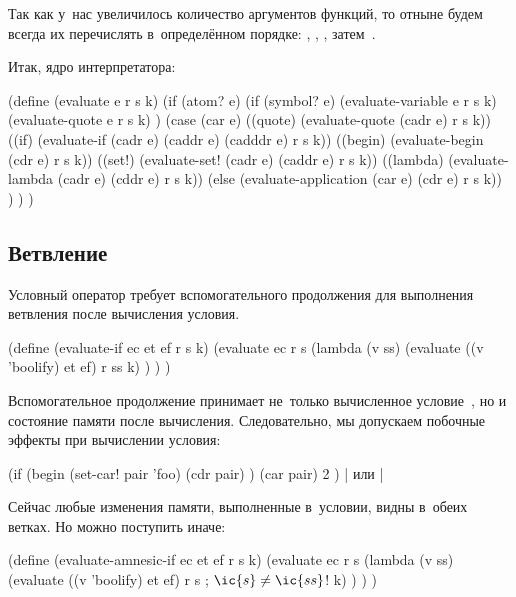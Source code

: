 Так как у~нас увеличилось количество аргументов функций, то отныне будем всегда
их перечислять в~определённом порядке: , , , затем~.

Итак, ядро интерпретатора:

\begin{code:lisp}
(define (evaluate e r s k)
  (if (atom? e)
      (if (symbol? e) (evaluate-variable e r s k)
          (evaluate-quote e r s k) )
      (case (car e)
        ((quote)  (evaluate-quote (cadr e) r s k))
        ((if)     (evaluate-if (cadr e) (caddr e) (cadddr e) r s k))
        ((begin)  (evaluate-begin (cdr e) r s k))
        ((set!)   (evaluate-set! (cadr e) (caddr e) r s k))
        ((lambda) (evaluate-lambda (cadr e) (cddr e) r s k))
        (else     (evaluate-application (car e) (cdr e) r s k)) ) ) )
\end{code:lisp}


\subsection{Ветвление}\label{assignment/implementation/ssect:condition}


Условный оператор требует вспомогательного продолжения для выполнения ветвления
после вычисления условия.

\begin{code:lisp}
(define (evaluate-if ec et ef r s k)
  (evaluate ec r s
    (lambda (v ss)
      (evaluate ((v 'boolify) et ef) r ss k) ) ) )
\end{code:lisp}

Вспомогательное продолжение принимает не~только вычисленное условие~, но и
состояние памяти после вычисления. Следовательно, мы допускаем побочные эффекты
при вычислении условия:

\begin{code:lisp}
(if (begin (set-car! pair 'foo)
           (cdr pair) )
    (car pair) 2 ) |{\is}  \textrm{или} |
\end{code:lisp}

Сейчас любые изменения памяти, выполненные в~условии, видны в~обеих ветках. Но
можно поступить иначе:

\begin{code:lisp}
(define (evaluate-amnesic-if ec et ef r s k)
  (evaluate ec r s
    (lambda (v ss)
      (evaluate ((v 'boolify) et ef) r s     ; $\ic{s} \ne \ic{ss}$!
                k) ) ) )
\end{code:lisp}

